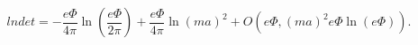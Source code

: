 \begin{equation}
\label{Eq_A46}
lndet = - \frac{e \Phi}{4 \pi} \ln \left(\frac{e\Phi}{2\pi}\right)
  + \frac{e\Phi}{4 \pi} \ln (ma)^2
  + O(e\Phi, (ma)^2 e\Phi \ln (e\Phi)).
\end{equation}

